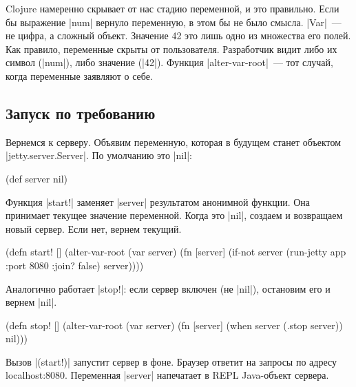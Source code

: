 Clojure намеренно скрывает от нас стадию переменной, и это правильно. Если бы
выражение \spverb|num| вернуло переменную, в этом бы не было смысла. \spverb|Var|~---
не цифра, а сложный объект. Значение 42 это лишь одно из множества его полей.
Как правило, переменные скрыты от пользователя. Разработчик видит либо их символ
(\spverb|num|), либо значение (\spverb|42|). Функция \spverb|alter-var-root|~---
тот случай, когда переменные заявляют о себе.

\subsection{Запуск по требованию}

Вернемся к серверу. Объявим переменную, которая в будущем станет объектом
\spverb|jetty.server.Server|. По умолчанию это \spverb|nil|:

\begin{english}
  \begin{clojure}
(def server nil)
  \end{clojure}
\end{english}

Функция \spverb|start!| заменяет \spverb|server| результатом анонимной
функции. Она принимает текущее значение переменной. Когда это \spverb|nil|,
создаем и возвращаем новый сервер. Если нет, вернем текущий.

\begin{english}
  \begin{clojure}
(defn start! []
  (alter-var-root
   (var server)
   (fn [server]
     (if-not server
       (run-jetty app {:port 8080 :join? false})
       server))))
  \end{clojure}
\end{english}

\noindent
Аналогично работает \spverb|stop!|: если сервер включен (не \spverb|nil|),
остановим его и вернем \spverb|nil|.

\begin{english}
  \begin{clojure}
(defn stop! []
  (alter-var-root
   (var server)
   (fn [server]
     (when server
       (.stop server))
     nil)))
  \end{clojure}
\end{english}

Вызов \spverb|(start!)| запустит сервер в фоне. Браузер ответит на запросы по
адресу localhost:8080. Переменная \spverb|server| напечатает в REPL Java-объект
сервера.

